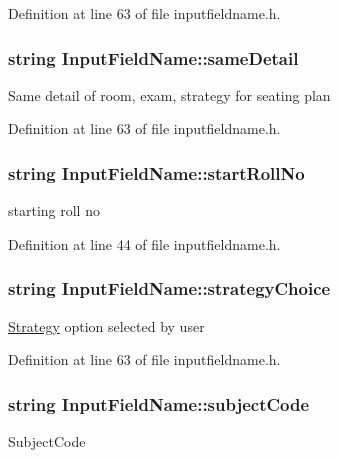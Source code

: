 \-Definition at line 63 of file inputfieldname.\-h.

\hypertarget{classInputFieldName_a6de91205e7eac3168e17d100ab4d8e64}{
\subsubsection[{same\-Detail}]{\setlength{\rightskip}{0pt plus 5cm}string {\bf \-Input\-Field\-Name\-::same\-Detail}}}\label{classInputFieldName_a6de91205e7eac3168e17d100ab4d8e64}
\-Same detail of room, exam, strategy for seating plan 

\-Definition at line 63 of file inputfieldname.\-h.

\hypertarget{classInputFieldName_a24baf5c915b4ee0fb8678e03adec043a}{
\subsubsection[{start\-Roll\-No}]{\setlength{\rightskip}{0pt plus 5cm}string {\bf \-Input\-Field\-Name\-::start\-Roll\-No}}}\label{classInputFieldName_a24baf5c915b4ee0fb8678e03adec043a}
starting roll no 

\-Definition at line 44 of file inputfieldname.\-h.

\hypertarget{classInputFieldName_a9a6b827d404cb279cc0ed836c069e4a9}{
\subsubsection[{strategy\-Choice}]{\setlength{\rightskip}{0pt plus 5cm}string {\bf \-Input\-Field\-Name\-::strategy\-Choice}}}\label{classInputFieldName_a9a6b827d404cb279cc0ed836c069e4a9}
\hyperlink{classStrategy}{\-Strategy} option selected by user 

\-Definition at line 63 of file inputfieldname.\-h.

\hypertarget{classInputFieldName_af1cc6871c33344c365e6e25ea482bd48}{
\subsubsection[{subject\-Code}]{\setlength{\rightskip}{0pt plus 5cm}string {\bf \-Input\-Field\-Name\-::subject\-Code}}}\label{classInputFieldName_af1cc6871c33344c365e6e25ea482bd48}
\-Subject\-Code 

